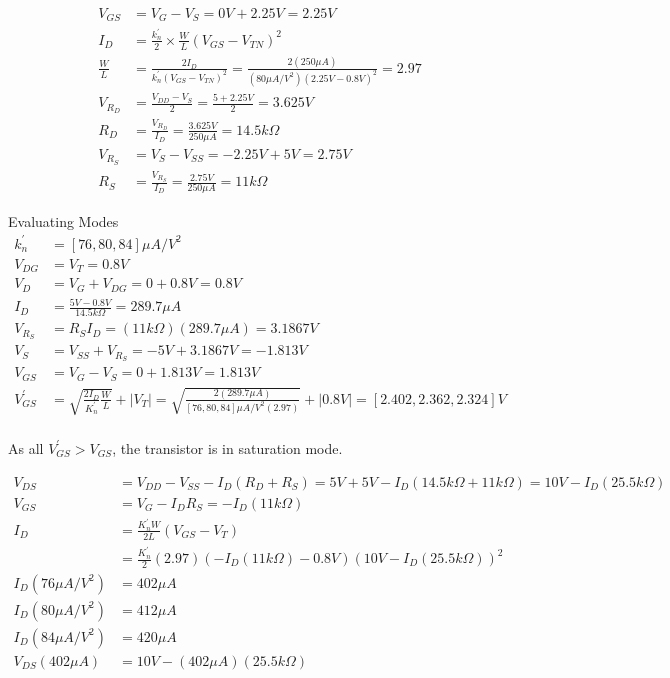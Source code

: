 \documentclass[12pt,letterpaper,titlepage]{article}
\begin{document}
\begin{raggedright}
\begin{align*}
   V_{GS} 
   	&= V_G - V_S
     = 0V + 2.25V
     = 2.25V
\\ I_D 
	&= \frac{k_n^\prime}{2}\times\frac{W}{L}(V_{GS} - V_{TN})^2
\\ \frac{W}{L} 
    &= \frac{2 I_D}{k_n^\prime(V_{GS} - V_{TN})^2}
	 = \frac{2 (250\mu A)}{(80\mu A/V^2)(2.25V - 0.8V)^2}
	 = 2.97
\\ V_{R_D} 
    &= \frac{V_{DD} - V_{S}}{2}
     = \frac{5 + 2.25V}{2}
     = 3.625V
\\ R_D 
	&= \frac{V_{R_D}}{I_D}
	 = \frac{3.625V}{250\mu A}
	 = 14.5k\Omega
\\ V_{R_S}
	&= V_S - V_{SS}
	 = -2.25V + 5V
	 = 2.75V
\\ R_S
	&= \frac{V_{R_S}}{I_D}
	 = \frac{2.75V}{250\mu A}
	 = 11k\Omega
\end{align*}

Evaluating Modes
\begin{align*}
   k_n^\prime &= [76, 80, 84]\mu A/V^2
\\ V_{DG}
	&= V_T
	 = 0.8V
\\ V_D 
    &= V_G + V_{DG} 
     = 0 + 0.8V = 0.8V
\\ I_D 
	&= \frac{5V-0.8V}{14.5k\Omega} 
 	 = 289.7\mu A
\\ V_{R_S} 
	&= R_SI_D
	 = (11k\Omega)(289.7\mu A)
	 = 3.1867V
\\ V_S
	&= V_{SS} + V_{R_S}
	 = -5V + 3.1867V
	 = -1.813V
\\ V_{GS}
	&= V_G - V_S
	 = 0 + 1.813V
	 = 1.813V
\\ V_{GS}^\prime
	&= \sqrt{\frac{2I_D}{K_n^\prime}\frac{W}{L}} + |V_T|
	 = \sqrt{\frac{2(289.7\mu A)}{[76, 80, 84]\mu A/V^2(2.97)}} + |0.8V|
	 = [2.402, 2.362, 2.324]V
\\ 
\end{align*}

As all $V_{GS}^\prime > V_{GS}$, the transistor is in saturation mode.

\begin{align*}
   V_{DS}
	&= V_{DD} - V_{SS} - I_D(R_D + R_S)
	 = 5V + 5V - I_D(14.5k\Omega + 11k\Omega)
	 = 10V - I_D(25.5k\Omega)
\\ V_{GS}
	&= V_G - I_DR_S
	 = -I_D(11k\Omega)
\\ I_D
	&= \frac{K_n^\prime W}{2L}(V_{GS} - V_T)
\\  &= \frac{K_n^\prime}{2}(2.97)(-I_D(11k\Omega) - 0.8V)(10V - I_D(25.5k\Omega))^2
\\ I_D(76\mu A/V^2)
	&= 402\mu A
\\ I_D(80\mu A/V^2)
	&= 412\mu A
\\ I_D(84\mu A/V^2)
	&= 420\mu A
\\ V_{DS}(402\mu A)
	&= 10V - (402\mu A)(25.5k\Omega)
\end{align*}


\end{raggedright}
\end{document}
